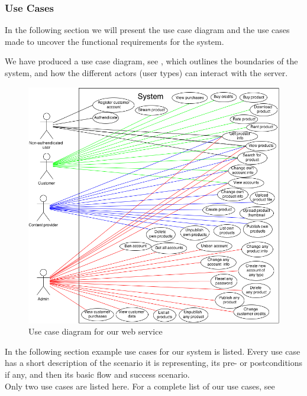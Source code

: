 \subsubsection{Use Cases}
In the following section we will present the use case diagram and the use cases made to uncover the functional requirements for the system.

We have produced a use case diagram, see , which outlines the boundaries of the system, and how the different actors (user types) can interact with the server. 
\begin{figure}[h]
\centering
\includegraphics[scale=0.5]{illustrations/UseCaseDiagram.png}
\caption{Use case diagram for our web service}
\label{useCaseImg}
\end{figure}


In the following section example use cases for our system is listed. Every use case has a short description of the scenario it is representing, its pre- or postconditions if any, and then its basic flow and success scenario.\\
Only two use cases are listed here. For a complete list of our use cases, see 


